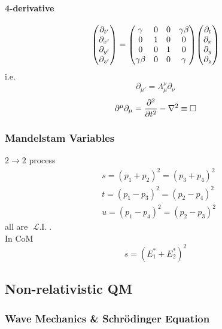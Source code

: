 \documentclass[a4paper]{article}
\DeclareMathOperator{\ra}{\rightarrow}
\DeclareMathOperator{\LI}{\mathscr{L}.I.}
\numberwithin{equation}{section}
\begin{document}
\paragraph{4-derivative}
\begin{equation}\label{key}
\mqty(\partial_{t'}\\\partial_{x'}\\\partial_{y'}\\\partial_{z'})
= \mqty(\gamma & 0 & 0 & \gamma\beta\\
0 & 1 & 0 & 0\\
0 & 0 & 1 & 0\\
\gamma\beta & 0 & 0 & \gamma)
\mqty(\partial_{t}\\\partial_{x}\\\partial_{y}\\\partial_{z})
\end{equation}
i.e.
\begin{equation}\label{key}
\partial_{\mu'} = \Lambda_\mu^\nu \partial_\nu
\end{equation}
\begin{equation}\label{key}
\partial^\mu\partial_\mu = \pdv[2]{t} - \nabla^2 \equiv \Box
\end{equation}

\subsubsection{Mandelstam Variables}
$ 2 \ra 2 $ process\\
\begin{equation}\label{key}
\begin{aligned}
&s = (p_1 + p_2)^2 = (p_3 + p_4)^2\\
&t = (p_1 - p_3)^2 = (p_2 - p_4)^2\\
&u = (p_1 - p_4)^2 = (p_2 - p_3)^2
\end{aligned}
\end{equation}
all are $ \LI $.\\
In CoM
\begin{equation}\label{key}
s = (E_1^* + E_2^*)^2
\end{equation}

\subsection{Non-relativistic QM}
\subsubsection{Wave Mechanics \& Schr\"odinger Equation}
\end{document}
